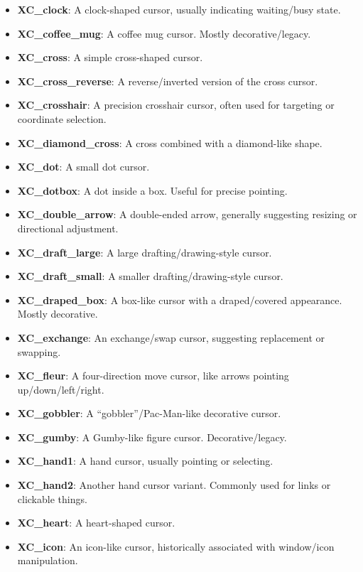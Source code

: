 \documentclass{report}
\begin{document}
\begin{itemize}
\begin{itemize}
                \item \textbf{XC\_clock}:	A clock-shaped cursor, usually indicating waiting/busy state.
                \item \textbf{XC\_coffee\_mug}:	A coffee mug cursor. Mostly decorative/legacy.
                \item \textbf{XC\_cross}:	A simple cross-shaped cursor.
                \item \textbf{XC\_cross\_reverse}:	A reverse/inverted version of the cross cursor.
                \item \textbf{XC\_crosshair}:	A precision crosshair cursor, often used for targeting or coordinate selection.
                \item \textbf{XC\_diamond\_cross}:	A cross combined with a diamond-like shape.
                \item \textbf{XC\_dot}:	A small dot cursor.
                \item \textbf{XC\_dotbox}:	A dot inside a box. Useful for precise pointing.
                \item \textbf{XC\_double\_arrow}:	A double-ended arrow, generally suggesting resizing or directional adjustment.
                \item \textbf{XC\_draft\_large}:	A large drafting/drawing-style cursor.
                \item \textbf{XC\_draft\_small}:	A smaller drafting/drawing-style cursor.
                \item \textbf{XC\_draped\_box}:	A box-like cursor with a draped/covered appearance. Mostly decorative.
                \item \textbf{XC\_exchange}:	An exchange/swap cursor, suggesting replacement or swapping.
                \item \textbf{XC\_fleur}:	A four-direction move cursor, like arrows pointing up/down/left/right.
                \item \textbf{XC\_gobbler}:	A “gobbler”/Pac-Man-like decorative cursor.
                \item \textbf{XC\_gumby}:	A Gumby-like figure cursor. Decorative/legacy.
                \item \textbf{XC\_hand1}:	A hand cursor, usually pointing or selecting.
                \item \textbf{XC\_hand2}:	Another hand cursor variant. Commonly used for links or clickable things.
                \item \textbf{XC\_heart}:	A heart-shaped cursor.
                \item \textbf{XC\_icon}:	An icon-like cursor, historically associated with window/icon manipulation.

\end{itemize}
\end{itemize}
\end{document}
